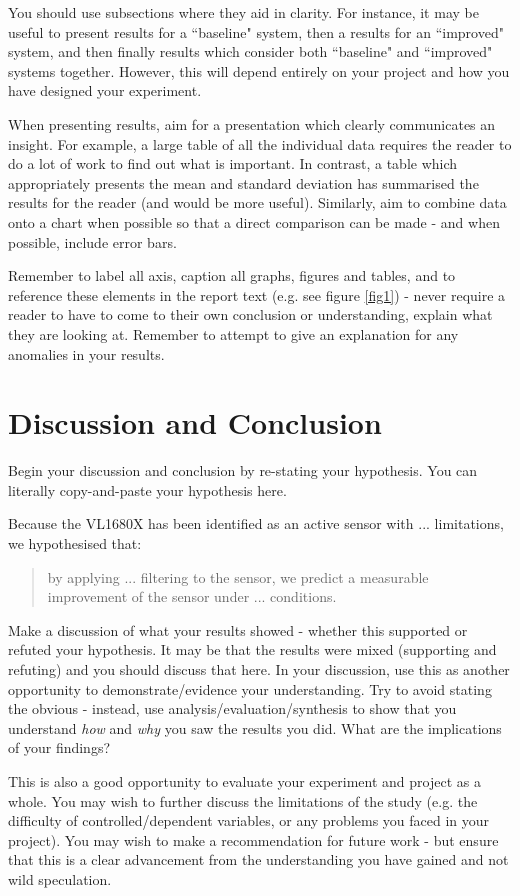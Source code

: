 \documentclass[conference]{IEEEtran}
\begin{document}
You should use subsections where they aid in clarity.  For instance, it may be useful to present results for a ``baseline" system, then a results for an ``improved" system, and then finally results which consider both ``baseline" and ``improved" systems together.  However, this will depend entirely on your project and how you have designed your experiment.

When presenting results, aim for a presentation which clearly communicates an insight. For example, a large table of all the individual data requires the reader to do a lot of work to find out what is important.  In contrast, a table which appropriately presents the mean and standard deviation has summarised the results for the reader (and would be more useful).  Similarly, aim to combine data onto a chart when possible so that a direct comparison can be made - and when possible, include error bars.  



Remember to label all axis, caption all graphs, figures and tables, and to reference these elements in the report text (e.g. see figure \ref{fig1}) - never require a reader to have to come to their own conclusion or understanding, explain what they are looking at.  Remember to attempt to give an explanation for any anomalies in your results.  


\section{Discussion and Conclusion}

Begin your discussion and conclusion by re-stating your hypothesis.  You can literally copy-and-paste your hypothesis here.  

Because the VL1680X has been identified as an active sensor with ... limitations, we hypothesised that:
\begin{quote}
    by applying ... filtering to the sensor, we predict a measurable improvement of the sensor under ... conditions.  
\end{quote}

Make a discussion of what your results showed - whether this supported or refuted your hypothesis.  It may be that the results were mixed (supporting and refuting) and you should discuss that here. In your discussion, use this as another opportunity to demonstrate/evidence your understanding. Try to avoid stating the obvious - instead, use analysis/evaluation/synthesis to show that you understand \emph{how} and \emph{why} you saw the results you did.  What are the implications of your findings?  

This is also a good opportunity to evaluate your experiment and project as a whole.  You may wish to further discuss the limitations of the study (e.g. the difficulty of controlled/dependent variables, or any problems you faced in your project).  You may wish to make a recommendation for future work - but ensure that this is a clear advancement from the understanding you have gained and not wild speculation.


 

\end{document}
